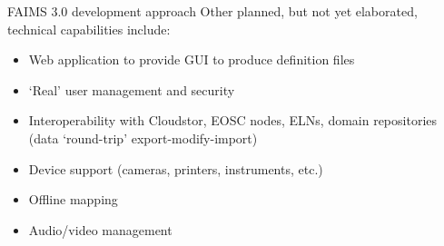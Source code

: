 

\begin{frame}{FAIMS 3.0 development approach}
Other planned, but not yet elaborated, technical capabilities include:
    \begin{itemize}
        \item Web application to provide GUI to produce definition files
        \item `Real' user management and security
        \item Interoperability with Cloudstor, EOSC nodes, ELNs, domain repositories (data `round-trip' export-modify-import)
        \item Device support (cameras, printers, instruments, etc.)
        \item Offline mapping
        \item Audio/video management
    \end{itemize}
\end{frame}




